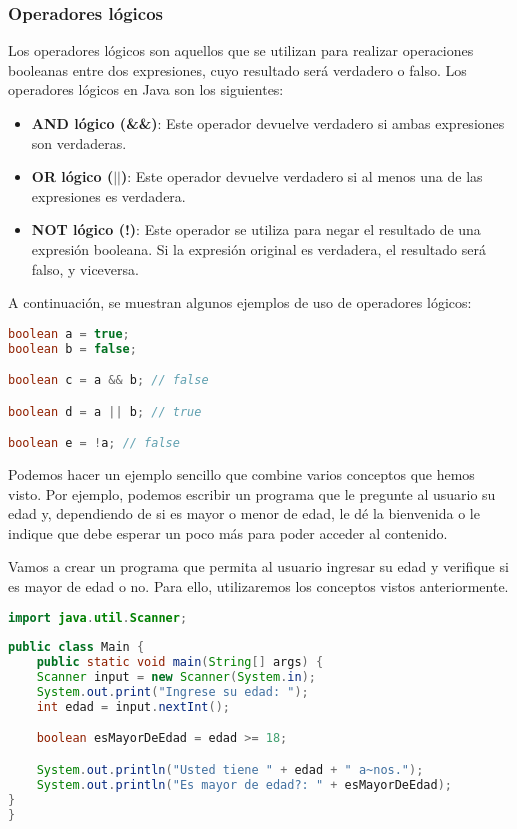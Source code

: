 \documentclass{article}
\begin{document}
\subsubsection*{Operadores lógicos}

Los operadores lógicos son aquellos que se utilizan para realizar operaciones booleanas entre dos expresiones, cuyo resultado será verdadero o falso. Los operadores lógicos en Java son los siguientes:

\begin{itemize}
\item \textbf{AND lógico (\&\&)}: Este operador devuelve verdadero si ambas expresiones son verdaderas.
\item \textbf{OR lógico ($||$)}: Este operador devuelve verdadero si al menos una de las expresiones es verdadera.
\item \textbf{NOT lógico (!)}: Este operador se utiliza para negar el resultado de una expresión booleana. Si la expresión original es verdadera, el resultado será falso, y viceversa.
\end{itemize}

A continuación, se muestran algunos ejemplos de uso de operadores lógicos:

\begin{lstlisting}[language=Java]
boolean a = true;
boolean b = false;

boolean c = a && b; // false

boolean d = a || b; // true

boolean e = !a; // false
\end{lstlisting}


Podemos hacer un ejemplo sencillo que combine varios conceptos que hemos visto. Por ejemplo, podemos escribir un programa que le pregunte al usuario su edad y, dependiendo de si es mayor o menor de edad, le dé la bienvenida o le indique que debe esperar un poco más para poder acceder al contenido.

Vamos a crear un programa que permita al usuario ingresar su edad y verifique si es mayor de edad o no. Para ello, utilizaremos los conceptos vistos anteriormente.

\begin{lstlisting}[language=Java]
import java.util.Scanner;
    
public class Main {
    public static void main(String[] args) {
    Scanner input = new Scanner(System.in);
    System.out.print("Ingrese su edad: ");
    int edad = input.nextInt();

    boolean esMayorDeEdad = edad >= 18;

    System.out.println("Usted tiene " + edad + " a~nos.");
    System.out.println("Es mayor de edad?: " + esMayorDeEdad);
}
}
\end{lstlisting}
\end{document}

